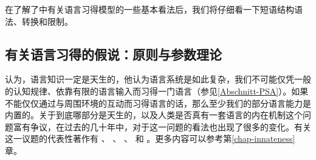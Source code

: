 在了解了\gbtc 中有关语言习得模型的一些基本看法后，我们将仔细看一下短语结构语法、转换和限制。

\subsection{有关语言习得的假说：原则与参数理论}
\label{Abschnitt-GB-Paramater}

 \citet[\S~I.8]{Chomsky65a}认为，语言知识一定是天生的，他认为语言系统是如此复杂，我们不可能仅凭一般的认知规律、依靠有限的语言输入而习得一门语言（参见\ref{Abschnitt-PSA}）。如果不能仅仅通过与周围环境的互动而习得语言的话，那么至少我们的部分语言能力是内置的。关于到底哪部分是天生的，以及人类是否真有一套语言的内在机制这个问题富有争议，在过去的几十年中，对于这一问题的看法也出现了很多的变化。有关这一议题的代表性著作有 、 、 、 和 。更多内容可以参考第\ref{chap-innateness}章。

